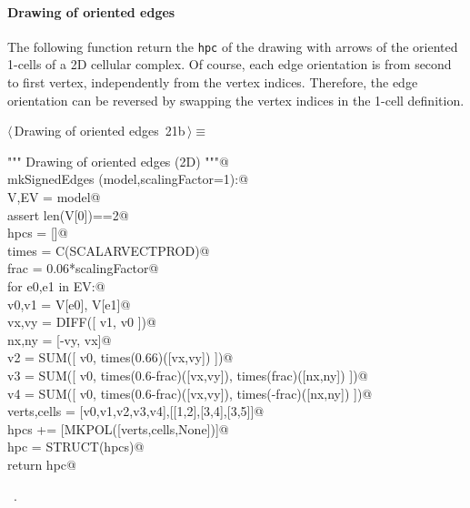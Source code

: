 \documentclass[11pt,oneside]{article}	%
\begin{document}
\paragraph{Drawing of oriented edges}
The following function return the \texttt{hpc} of the drawing with arrows of the oriented 1-cells of a 2D cellular complex. Of course, each edge orientation is from second to first vertex, independently from the vertex indices. Therefore, the edge orientation can be reversed by swapping the vertex indices in the 1-cell definition. 
\begin{flushleft} \small \label{scrap34}
\protect{}$\langle\,$Drawing of oriented edges\nobreak\ {\footnotesize 21b}$\,\rangle\equiv$
\vspace{-1ex}
\begin{list}{}{} \item
\mbox{}\verb@""" Drawing of oriented edges (2D) """@\\
\mbox{}\verb@def mkSignedEdges (model,scalingFactor=1):@\\
\mbox{}\verb@   V,EV = model@\\
\mbox{}\verb@   assert len(V[0])==2@\\
\mbox{}\verb@   hpcs = []@\\
\mbox{}\verb@   times = C(SCALARVECTPROD)@\\
\mbox{}\verb@   frac = 0.06*scalingFactor@\\
\mbox{}\verb@   for e0,e1 in EV:@\\
\mbox{}\verb@      v0,v1 = V[e0], V[e1]@\\
\mbox{}\verb@      vx,vy = DIFF([ v1, v0 ])@\\
\mbox{}\verb@      nx,ny = [-vy, vx]@\\
\mbox{}\verb@      v2 = SUM([ v0, times(0.66)([vx,vy]) ])@\\
\mbox{}\verb@      v3 = SUM([ v0, times(0.6-frac)([vx,vy]), times(frac)([nx,ny]) ])@\\
\mbox{}\verb@      v4 = SUM([ v0, times(0.6-frac)([vx,vy]), times(-frac)([nx,ny]) ])@\\
\mbox{}\verb@      verts,cells = [v0,v1,v2,v3,v4],[[1,2],[3,4],[3,5]]@\\
\mbox{}\verb@      hpcs += [MKPOL([verts,cells,None])]@\\
\mbox{}\verb@   hpc = STRUCT(hpcs)@\\
\mbox{}\verb@   return hpc@\\
\mbox{}\verb@@{\NWsep}
\end{list}
\vspace{-1ex}
\footnotesize\addtolength{\baselineskip}{-1ex}
\begin{list}{}{\setlength{\itemsep}{-\parsep}\setlength{\itemindent}{-\leftmargin}}
\item \NWtxtMacroRefIn\ .
\end{list}
\end{flushleft}
\end{document}
